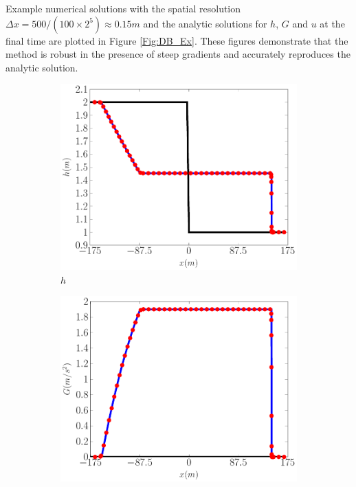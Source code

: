 \documentclass[10pt]{elsarticle}
\begin{document}
Example numerical solutions with the spatial resolution $\Delta x = 500 / (100 \times 2^{5}) \approx  0.15m$ and the analytic solutions for $h$, $G$ and $u$ at the final time are plotted in Figure \ref{Fig:DB_Ex}. These figures demonstrate that the method is robust in the presence of steep gradients and accurately reproduces the analytic solution. 
%
\begin{figure}
	\centering
	\begin{subfigure}{0.32\textwidth}
		\centering
		\includegraphics[width=\textwidth]{./Figures/Simulations/Validation/DBSWWE/hEx.pdf}
		\caption{$h$}
	\end{subfigure}
	\begin{subfigure}{0.32\textwidth}
		\centering
		\includegraphics[width=\textwidth]{./Figures/Simulations/Validation/DBSWWE/GEx.pdf}

\end{subfigure}
\end{figure}
\end{document}
